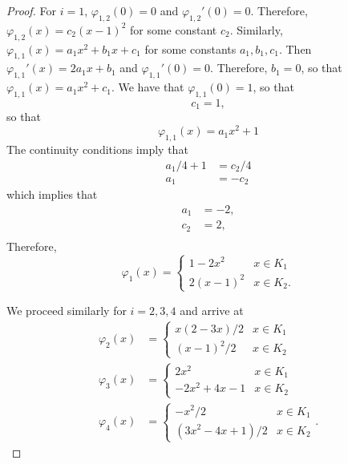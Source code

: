 \documentclass{article}
\begin{document}
\begin{enumerate}
\begin{proof}
		      For $i=1$, $\varphi_{1,2}(0) = 0$ and $\varphi_{1,2}'(0) = 0$.
		      Therefore, $\varphi_{1,2}(x) = c_2(x-1)^2$ for some constant $c_2$.
		      Similarly, $\varphi_{1,1}(x) = a_1x^2 + b_1x + c_1$ for some constants $a_1,b_1,c_1$.
		      Then $\varphi_{1,1}'(x) = 2a_1x + b_1$ and $\varphi_{1,1}'(0) = 0$.
		      Therefore, $b_1 = 0$, so that $\varphi_{1,1}(x) = a_1x^2 + c_1$.
		      We have that $\varphi_{1,1}(0) = 1$, so that \[c_1 = 1,\]
		      so that \[\varphi_{1,1}(x) = a_1x^2 + 1\]
		      The continuity conditions imply that
		      \begin{align*}
			      a_1/4 + 1 & = c_2/4 \\
			      a_1       & = -c_2
		      \end{align*}
		      which implies that
		      \begin{align*}
			      a_1 & = -2, \\
			      c_2 & = 2,  \\
		      \end{align*}
		      Therefore,
		      \begin{equation*}
			      \varphi_1(x) =
			      \begin{cases}
				      1-2x^2   & x \in K_1 \\
				      2(x-1)^2 & x\in K_2.
			      \end{cases}
		      \end{equation*}

		      We proceed similarly for $i = 2,3,4$ and arrive at
		      \begin{align*}
			      \varphi_2(x) & =
			      \begin{cases}
				      x(2-3x)/2 & x \in K_1 \\
				      (x-1)^2/2 & x \in K_2
			      \end{cases}     \\
			      \varphi_3(x) & =
			      \begin{cases}
				      2x^2          & x \in K_1 \\
				      -2x^2 + 4x -1 & x \in K_2
			      \end{cases} \\
			      \varphi_4(x) & =
			      \begin{cases}
				      -x^2/2        & x \in K_1 \\
				      (3x^2-4x+1)/2 & x \in K_2
			      \end{cases}.
		      \end{align*}
	      \end{proof}


\end{enumerate}
\end{document}
